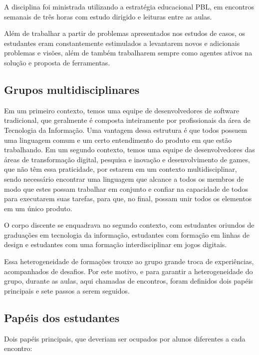 \documentclass[12pt, onecolumn]{IEEEtran}
\begin{document}
A disciplina foi ministrada utilizando a estratégia educacional PBL, em encontros semanais de três horas com estudo dirigido e leituras entre as aulas.

Além de trabalhar a partir de problemas apresentados nos estudos de casos, os estudantes eram constantemente estimulados a levantarem novos e adicionais problemas e visões, além de também trabalharem sempre como agentes ativos na solução e proposta de ferramentas.

\subsection{Grupos multidisciplinares}

Em um primeiro contexto, temos uma equipe de desenvolvedores de software tradicional, que geralmente é composta inteiramente por profissionais da área de Tecnologia da Informação. Uma vantagem dessa estrutura é que todos possuem uma linguagem comum e um certo entendimento do produto em que estão trabalhando. Em um segundo contexto, temos uma equipe de desenvolvedores das áreas de transformação digital, pesquisa e inovação e desenvolvimento de games, que não têm essa praticidade, por estarem em um contexto multidisciplinar, sendo necessário encontrar uma linguagem que alcance a todos os membros de modo que estes possam trabalhar em conjunto e confiar na capacidade de todos para executarem suas tarefas, para que, no final, possam unir todos os elementos em um único produto\cite{b16}.

O corpo discente se enquadrava no segundo contexto, com estudantes oriundos de graduações em tecnologia da informação, estudantes com formação em linhas de design e estudantes com uma formação interdisciplinar em jogos digitais.

Essa heterogeneidade de formações trouxe ao grupo grande troca de experiências, acompanhados de desafios. Por este motivo, e para garantir a heterogeneidade do grupo, durante as aulas, aqui chamadas de encontros, foram definidos dois papéis principais e sete passos a serem seguidos.


\subsection{Papéis dos estudantes}
Dois papéis principais, que deveriam ser ocupados por alunos diferentes a cada encontro:
\end{document}

